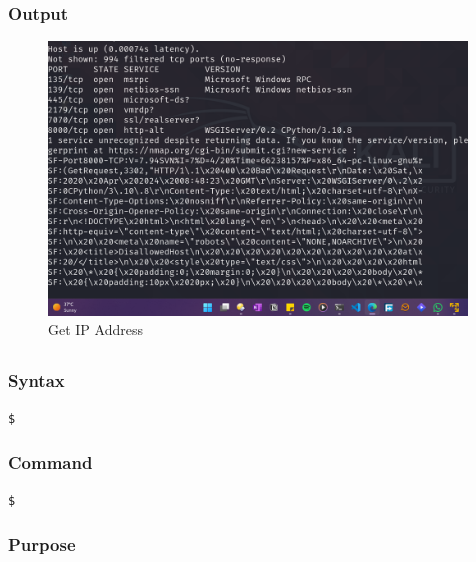 \documentclass[11pt]{article}
\begin{document}
\subsubsection*{Output}
\begin{figure}[H]
    \centering
    \includegraphics[width=0.99\textwidth]{a3_ss (3).png}
    \caption{Get IP Address}
    \label{fig:1}
\end{figure}
\subsection{}

\subsubsection*{Syntax}
\begin{verbatim}
$
\end{verbatim}

\subsubsection*{Command}
\begin{verbatim}
$
\end{verbatim}

\subsubsection*{Purpose}
\end{document}
